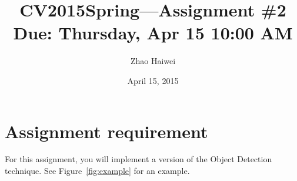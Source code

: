 \documentclass[12pt]{article}
\begin{document}
\title{\vspace{-2em}CV2015Spring---Assignment \#\textbf{2}\\
\normalsize{Due: Thursday, Apr 15 10:00 AM}}
\author{Zhao Haiwei}
\date{\vspace{-0.7em}April 15, 2015\vspace{-0.7em}}
\maketitle\thispagestyle{fancy}
\maketitle


\section{Assignment requirement}

For this assignment, you will implement a version of the Object Detection technique. See Figure~\ref{fig:example} for an example.
\end{document}
